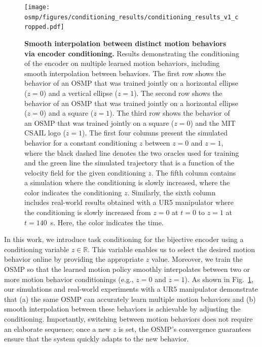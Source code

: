 \begin{figure}[h]
    \centering
    \texttt{[image: osmp/figures/conditioning\_results/conditioning\_results\_v1\_cropped.pdf]}
    \caption{
    \textbf{Smooth interpolation between distinct motion behaviors via encoder conditioning.}
    Results demonstrating the conditioning of the encoder on multiple learned motion behaviors, including smooth interpolation between behaviors.
    The first row shows the behavior of an OSMP that was trained jointly on a horizontal ellipse ($z=0$) and a vertical ellipse ($z=1$).
    The second row shows the behavior of an OSMP that was trained jointly on a horizontal ellipse ($z=0$) and a square ($z=1$).
    The third row shows the behavior of an OSMP that was trained jointly on a square ($z=0$) and the MIT CSAIL logo ($z=1$).
    The first four columns present the simulated behavior for a constant conditioning $z$ between $z=0$ and $z=1$, where the black dashed line denotes the two oracles used for training and the green line the simulated trajectory that is a function of the velocity field for the given conditioning $z$.
    The fifth column contains a simulation where the conditioning is slowly increased, where the color indicates the conditioning $z$.
    Similarly, the sixth column includes real-world results obtained with a UR5 manipulator where the conditioning is slowly increased from $z=0$ at $t=0$ to $z=1$ at $t=140$~s. Here, the color indicates the time.
    }
    \label{fig:osmp:conditioning_results}
\end{figure}

In this work, we introduce task conditioning for the bijective encoder using a conditioning variable $z \in \mathbb{R}$. This variable enables us to select the desired motion behavior online by providing the appropriate $z$ value. Moreover, we train the \gls{OSMP} so that the learned motion policy smoothly interpolates between two or more motion behavior conditionings (e.g., $z=0$ and $z=1$). As shown in Fig.~\ref{fig:osmp:conditioning_results}, our simulations and real-world experiments with a UR5 manipulator demonstrate that (a) the same \gls{OSMP} can accurately learn multiple motion behaviors and (b) smooth interpolation between these behaviors is achievable by adjusting the conditioning. Importantly, switching between motion behaviors does not require an elaborate sequence; once a new $z$ is set, the \gls{OSMP}’s convergence guarantees ensure that the system quickly adapts to the new behavior.